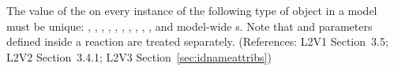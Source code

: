 The value of the   on every instance of the
following type of object in a model must be unique: \Model,
\FunctionDefinition, \CompartmentType, \Compartment, \SpeciesType,
\Species, \Reaction, \SpeciesReference, \ModifierSpeciesReference,
\Event, and model-wide \Parameter{}s.  Note that \UnitDefinition
and parameters defined inside a reaction are treated separately.
(References: L2V1 Section~3.5; L2V2 Section~3.4.1; L2V3
Section~\ref{sec:idnameattribs})
